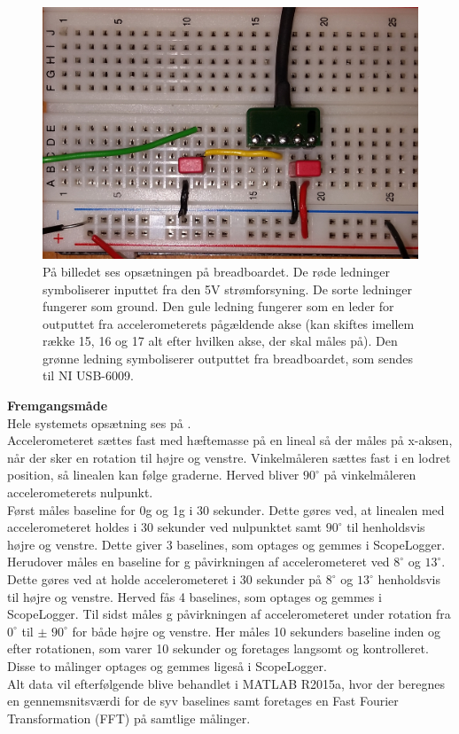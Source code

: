 \begin{figure}[H]
	\centering
	\label{pforsoeg1}
	\includegraphics[scale=0.15]{figures/cProblemloesning/Pilotforsoeg2.jpg}
	\caption{På billedet ses opsætningen på breadboardet. De røde ledninger symboliserer inputtet fra den 5V strømforsyning. De sorte ledninger fungerer som ground. Den gule ledning fungerer som en leder for outputtet fra accelerometerets pågældende akse (kan skiftes imellem række 15, 16 og 17 alt efter hvilken akse, der skal måles på). Den grønne ledning symboliserer outputtet fra breadboardet, som sendes til NI USB-6009.}
\end{figure}

\noindent\textbf{Fremgangsmåde}\\
Hele systemets opsætning ses på . \\
Accelerometeret sættes fast med hæftemasse på en lineal så der måles på x-aksen, når der sker en rotation til højre og venstre. Vinkelmåleren sættes fast i en lodret position, så linealen kan følge graderne. Herved bliver $90^{\circ}$ på vinkelmåleren accelerometerets nulpunkt. \\
Først måles baseline for 0g og 1g i 30 sekunder. Dette gøres ved, at linealen med accelerometeret holdes i 30 sekunder ved nulpunktet samt $90^{\circ}$ til henholdsvis højre og venstre. Dette giver 3 baselines, som optages og gemmes i ScopeLogger. Herudover måles en baseline for g påvirkningen af accelerometeret ved $8^{\circ}$ og $13^{\circ}$. Dette gøres ved at holde accelerometeret i 30 sekunder på $8^{\circ}$ og $13^{\circ}$ henholdsvis til højre og venstre. Herved fås 4 baselines, som optages og gemmes i ScopeLogger.
Til sidst måles g påvirkningen af accelerometeret under rotation fra $0^{\circ}$ til $\pm$ $90^{\circ}$ for både højre og venstre. Her måles 10 sekunders baseline inden og efter rotationen, som varer 10 sekunder og foretages langsomt og kontrolleret. Disse to målinger optages og gemmes ligeså i ScopeLogger. \\
Alt data vil efterfølgende blive behandlet i MATLAB R2015a, hvor der beregnes en gennemsnitsværdi for de syv baselines samt foretages en Fast Fourier Transformation (FFT) på samtlige målinger.

